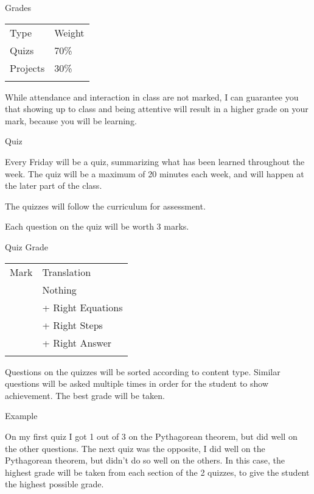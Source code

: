 \documentclass[ignorenonframetext,]{beamer}
\begin{document}
\begin{frame}{Grades}

\begin{longtable}[c]{@{}ll@{}}
\toprule\addlinespace
Type & Weight
\\\addlinespace
\midrule\endhead
Quizs & 70\%
\\\addlinespace
Projects & 30\%
\\\addlinespace
\bottomrule
\end{longtable}

While attendance and interaction in class are not marked, I can
guarantee you that showing up to class and being attentive will result
in a higher grade on your mark, because you will be learning.

\begin{block}{Quiz}

Every Friday will be a quiz, summarizing what has been learned
throughout the week. The quiz will be a maximum of 20 minutes each week,
and will happen at the later part of the class.

The quizzes will follow the curriculum for assessment.

Each question on the quiz will be worth 3 marks.

\begin{block}{Quiz Grade}

\begin{longtable}[c]{@{}ll@{}}
\toprule\addlinespace
Mark & Translation
\\\addlinespace
\midrule\endhead
0 & Nothing
\\\addlinespace
1 & + Right Equations
\\\addlinespace
2 & + Right Steps
\\\addlinespace
3 & + Right Answer
\\\addlinespace
\bottomrule
\end{longtable}

Questions on the quizzes will be sorted according to content type.
Similar questions will be asked multiple times in order for the student
to show achievement. The best grade will be taken.

\end{block}

\begin{block}{Example}

On my first quiz I got 1 out of 3 on the Pythagorean theorem, but did
well on the other questions. The next quiz was the opposite, I did well
on the Pythagorean theorem, but didn't do so well on the others. In this
case, the highest grade will be taken from each section of the 2
quizzes, to give the student the highest possible grade.


\end{block}
\end{block}
\end{frame}
\end{document}
